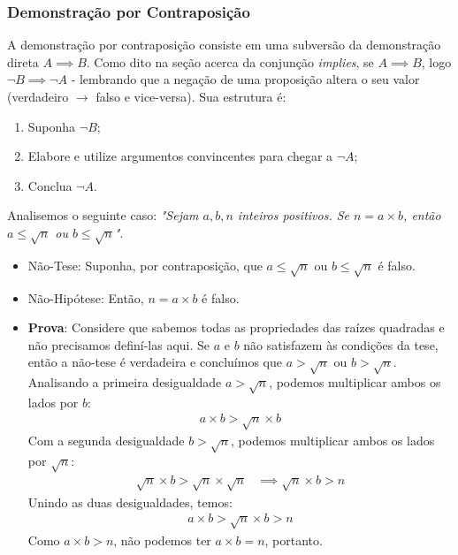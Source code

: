 \documentclass[13pt,letterpaper]{article}
\begin{document}
\subsubsection{Demonstração por Contraposição}
A demonstração por contraposição consiste em uma subversão da demonstração direta $A \implies B$. Como dito na seção acerca da conjunção \emph{implies}, se $A \implies B$, logo $\lnot B \implies \lnot A$ - lembrando que a negação de uma proposição altera o seu valor (verdadeiro $\rightarrow$ falso e vice-versa).
Sua estrutura é:
\begin{enumerate}
    \item Suponha $\lnot B$;
    \item Elabore e utilize argumentos convincentes para chegar a $\lnot A$;
    \item Conclua $\lnot A$.
\end{enumerate}
Analisemos o seguinte caso: \emph{"Sejam $a, b, n$ inteiros positivos. Se $n = a \times b$, então $ a \leq \sqrt{n}$ ou $b \leq \sqrt{n}$"}.
\begin{itemize}
    \item Não-Tese: Suponha, por contraposição, que $a \leq \sqrt{n}$ ou $b \leq \sqrt{n}$ é falso.
    \item Não-Hipótese: Então, $n = a \times b$ é falso.
    \item \textbf{Prova}: Considere que sabemos todas as propriedades das raízes quadradas e não precisamos definí-las aqui. Se $a$ e $b$ não satisfazem às condições da tese, então a não-tese é verdadeira e concluímos que $a > \sqrt{n}$ ou $b > \sqrt{n}$. Analisando a primeira desigualdade $a > \sqrt{n}$, podemos multiplicar ambos os lados por $b$:
    \begin{align*}
        a \times b > \sqrt{n} \times b
    \end{align*}
    Com a segunda desigualdade $b > \sqrt{n}$, podemos multiplicar ambos os lados por $\sqrt{n}$:
    \begin{align*}
        \sqrt{n} \times b > \sqrt{n} \times \sqrt{n} &\implies
        \sqrt{n} \times b > n
    \end{align*}
    Unindo as duas desigualdades, temos:
    \begin{align*}
        a \times b > \sqrt{n} \times b > n
    \end{align*}
   Como $a \times b > n$, não podemos ter $a \times b = n$, portanto.
    
\end{itemize}
\end{document}
